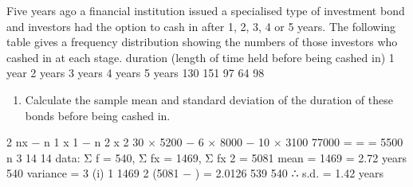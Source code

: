 \documentclass[a4paper,12pt]{article}
\begin{document}
Five years ago a financial institution issued a specialised type of investment bond and investors had the option to cash in after 1, 2, 3, 4 or 5 years. The following table gives a frequency distribution showing the numbers of those investors who cashed in
at each stage.
duration (length of time held before being cashed in)
1 year
2 years
3 years
4 years
5 years
130
151
97
64
98
\begin{enumerate} 

\item Calculate the sample mean and standard deviation of the duration of these bonds before being cashed in.

\end{enumerate}

\newpage

2
nx − n 1 x 1 − n 2 x 2 30 × 5200 − 6 × 8000 − 10 × 3100 77000
=
=
= 5500
n 3
14
14
data: Σ f = 540, Σ fx = 1469, Σ fx 2 = 5081
mean =
1469
= 2.72 years
540
variance =
3
(i)
1
1469 2
(5081 −
) = 2.0126
539
540
∴ s.d. = 1.42 years
\end{document}
